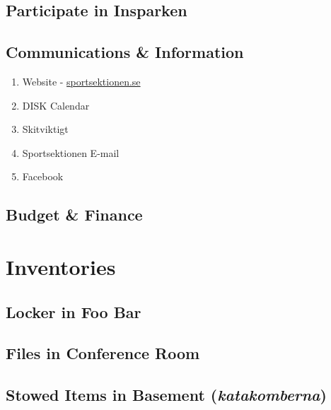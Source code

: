 \documentclass[12pt,a4paper]{article}
\begin{document}
		\subsection{Participate in Insparken}
		\subsection{Communications \& Information}
			\begin{enumerate}
				\item Website - \href{http://sportsektionen.se}{sportsektionen.se}
				\item DISK Calendar
				\item Skitviktigt
				\item Sportsektionen E-mail
				\item Facebook
			\end{enumerate}
		\subsection{Budget \& Finance}

	\section{Inventories}
		\subsection{Locker in Foo Bar}
		\subsection{Files in Conference Room}
		\subsection{Stowed Items in Basement (\emph{katakomberna})}
\end{document}

